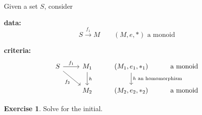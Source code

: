 \documentclass[a4paper, 12pt]{article}
\theoremstyle{definition}
\newtheorem{exercise}{Exercise}
\begin{document}
Given a set $S$, consider

\textbf{data:}
$$
S \overset{f_1}{\longrightarrow}M \qquad \text{$(M,e,\ast)$ a monoid}
$$

\textbf{criteria:}
$$
\begin{tikzcd}
    S \arrow[r, "f_1"] \arrow[dr, swap, "f_2"] & 
    M_1 
    \arrow[d, "h"] 
    & (M_1,e_1,\ast_1) 
    \arrow[d, "\text{$h$ an homomorphism}"] 
    & \text{a monoid}
    \\
    {}  
    & M_2 & (M_2,e_2,\ast_2) & \text{a monoid}
\end{tikzcd}
$$

\begin{exercise}
    Solve for the initial.
\end{exercise}
\end{document}
